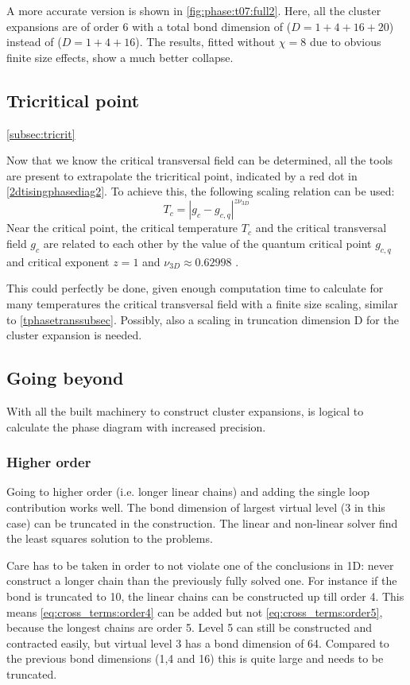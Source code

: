 A more accurate version is shown in \cref{fig:phase:t07:full2}. Here, all the cluster expansions are of order 6 with a total bond dimension of ($D = 1+4+16+20$) instead of ($D = 1+4+16$). The results, fitted without $\chi=8$ due to obvious finite size effects, show a much better collapse.

\subsection{Tricritical point}\cref{subsec:tricrit}

Now that we know the critical transversal field can be determined, all the tools are present to extrapolate the tricritical point, indicated by a red dot in \cref{2dtisingphasediag2}. To achieve this, the following scaling relation can be used:
\begin{equation}
    T_c = \left| g_c-g_{c,q} \right|^{z \nu_{3D}}
\end{equation}
Near the critical point, the critical temperature $T_c$ and the critical transversal field $g_c$ are related to each other by the value of the quantum critical point $g_{c,q}$ and critical exponent $z=1$ and $\nu_{3D} \approx 0.62998$ \cite{Hesselmann2016}.

This could perfectly be done, given enough computation time to calculate for many temperatures the critical transversal field with a finite size scaling, similar to \cref{tphasetranssubsec}. Possibly, also a scaling in truncation dimension D for the cluster expansion is needed.

\subsection{Going beyond}
With all the built machinery to construct cluster expansions, is logical to calculate the phase diagram with increased precision.

\subsubsection{Higher order}

Going to higher order (i.e. longer linear chains) and adding the single loop contribution works well. The bond dimension of largest virtual level (3 in this case) can be truncated in the construction. The linear and non-linear solver find the least squares solution to the problems.

Care has to be taken in order to not violate one of the conclusions in 1D: never construct a longer chain than the previously fully solved one. For instance if the bond is truncated to 10, the linear chains can be constructed up till order 4. This means \cref{eq:cross_terms:order4} can be added but not \cref{eq:cross_terms:order5}, because the longest chains are order 5. Level 5 can still be constructed and contracted easily, but virtual level 3 has a bond dimension of 64. Compared to the previous bond dimensions (1,4 and 16) this is quite large and needs to be truncated.


